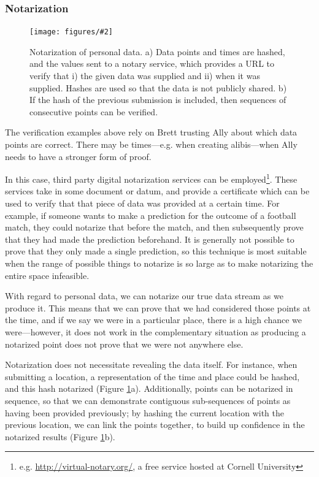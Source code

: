 \documentclass{IOS-Book-Article}     %
\newcommand{\fig}[3][0.9]{
\begin{figure}[tp]
\begin{center}
\texttt{[image: figures/\#2]}
\caption{#3}
\label{fig:#2}
\end{center}
\end{figure}
}
\begin{document}
\subsubsection{Notarization}
\label{sec:notarization}
\fig{Notarization}{Notarization of personal data. a) Data points and times are
hashed, and the values sent to a notary service, which provides a URL to verify
that i) the given data was supplied and ii) when it was supplied. Hashes are
used so that the data is not publicly shared. b) If the hash of the previous
submission is included, then sequences of consecutive points can be verified.}

The verification examples above rely on Brett trusting Ally about which
data points are correct. There may be times---e.g. when creating alibis---when
Ally needs to have a stronger form of proof.

In this case, third party digital notarization services can be
employed\footnote{e.g.
\url{http://virtual-notary.org/}, a free service hosted at Cornell University}.
These services take in some document or datum, and provide a certificate which
can be used to verify that that piece of data was provided at a certain time. 
For example, if someone wants to make a prediction
for the outcome of a football match, they could notarize that before the match,
and then subsequently prove that they had made the prediction beforehand. It is
generally not possible to prove that they only made a single prediction, so this technique is most suitable when the range of possible things to notarize
is so large as to make notarizing the entire space infeasible.

With regard to personal data, we can notarize our true data stream as we produce
it. This means that we can prove that we had considered those points at the
time, and if we say we were in a particular place, there is a high chance we
were---however, it does not work in the complementary situation as producing a
notarized point does not prove that we were not anywhere else.


Notarization does not necessitate revealing the data itself. For instance,
when submitting a location, a representation of the time and place could be
hashed, and this hash notarized (Figure \ref{fig:Notarization}a). Additionally,
points can be notarized in sequence, so that we can demonstrate contiguous sub-sequences 
of points as having been provided previously; by
hashing the current location with the previous location, we can link the points
together, to build up confidence in the notarized results (Figure
\ref{fig:Notarization}b).
\end{document}
